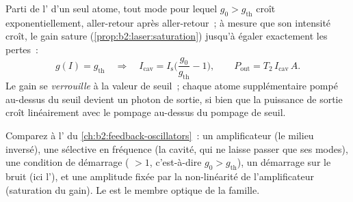 \begin{proposition}\label{prop:b2:laser:steady}
Parti de l' d'un seul atome, tout mode pour
lequel $g_0 > g_{\text{th}}$ croît exponentiellement, aller-retour après
aller-retour~; à mesure que son intensité croît, le gain sature
(\cref{prop:b2:laser:saturation}) jusqu'à égaler exactement les pertes~:
\[
g(I) = g_{\text{th}} \quad\Longrightarrow\quad
I_{\text{cav}} = I_{\text{s}}\Big(\frac{g_0}{g_{\text{th}}} - 1\Big),
\qquad P_{\text{out}} = T_2\,I_{\text{cav}}\,A .
\]
Le gain se \emph{verrouille} à la valeur de seuil~; chaque atome supplémentaire
pompé au-dessus du seuil devient un photon de sortie, si bien que la puissance de sortie
croît linéairement avec le pompage au-dessus du pompage de seuil.
\end{proposition}

\begin{remark}\label{rem:b2:laser:feedback}
Comparez à l' du
\cref{ch:b2:feedback-oscillators}~: un amplificateur (le milieu inversé),
une  sélective en fréquence (la cavité, qui ne laisse passer que ses modes),
une condition de démarrage ( $> 1$, c'est-à-dire $g_0 > g_{\text{th}}$),
un démarrage sur le bruit (ici l'), et une amplitude fixée
par la non-linéarité de l'amplificateur (saturation du gain). Le  est
le membre optique de la famille.
\end{remark}

